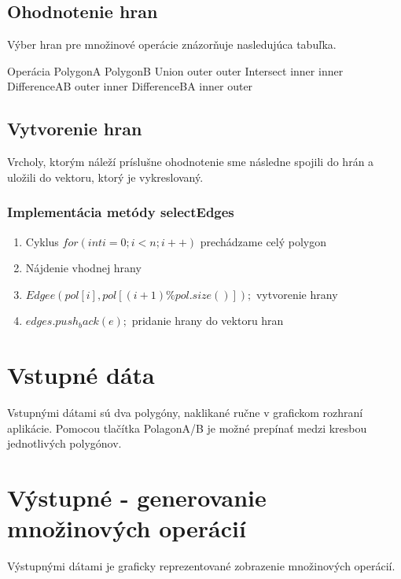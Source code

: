 \documentclass[12pt]{article}
\begin{document}
\subsection {Ohodnotenie hran}
Výber hran pre množinové operácie znázorňuje nasledujúca tabuľka.

 Operácia \hspace {1.5cm} PolygonA \hspace {1.0cm} PolygonB 
\newline Union \hspace {1.5cm} outer \hspace {1.0cm} outer 
\newline Intersect \hspace {1.4cm} inner \hspace {1.0cm} inner 
\newline DifferenceAB \hspace {1.0cm} outer \hspace {1.0cm} inner 
\newline DifferenceBA \hspace {1.0cm} inner \hspace {1.0cm}outer

\subsection {Vytvorenie hran}
Vrcholy, ktorým náleží príslušne ohodnotenie sme následne spojili do hrán a uložili do vektoru, ktorý je vykreslovaný.

\subsubsection{Implementácia metódy selectEdges}
\begin{enumerate}
\item Cyklus $ for(int i = 0; i < n; i++)$  prechádzame celý polygon
\item Nájdenie vhodnej hrany
\item \hspace {1.0cm} $Edge e (pol[i], pol[(i+1)\%pol.size()]);$ vytvorenie hrany
\item \hspace {1.0cm} $edges.push_back(e);$ pridanie hrany do vektoru hran
\end{enumerate}
\clearpage 
\section{Vstupné dáta}
Vstupnými dátami sú dva polygóny, naklikané ručne v grafickom rozhraní aplikácie. Pomocou tlačítka PolagonA/B je možné prepínať medzi kresbou jednotlivých polygónov.

\section{Výstupné - generovanie množinových operácií}
Výstupnými dátami je graficky reprezentované zobrazenie množinových operácií.
\end{document}
